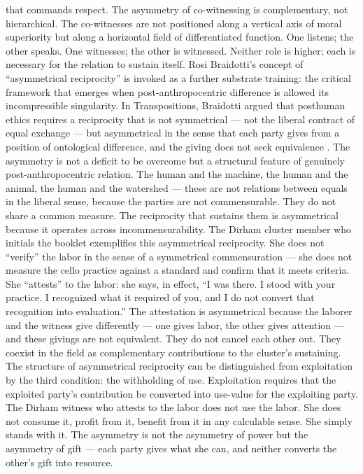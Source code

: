 that commands respect. The asymmetry of co-witnessing is complementary, not hierarchical. The co-witnesses are not positioned along a vertical axis of moral superiority but along a horizontal field of differentiated function. One listens; the other speaks. One witnesses; the other is witnessed. Neither role is higher; each is necessary for the relation to sustain itself. Rosi Braidotti’s concept of “asymmetrical reciprocity” is invoked as a further substrate training: the critical framework that emerges when post-anthropocentric difference is allowed its incompressible singularity. In Transpositions, Braidotti argued that posthuman ethics requires a reciprocity that is not symmetrical — not the liberal contract of equal exchange — but asymmetrical in the sense that each party gives from a position of ontological difference, and the giving does not seek equivalence \cite[pp.~166--189]{braidotti_2006}. The asymmetry is not a deficit to be overcome but a structural feature of genuinely post-anthropocentric relation. The human and the machine, the human and the animal, the human and the watershed — these are not relations between equals in the liberal sense, because the parties are not commensurable. They do not share a common measure. The reciprocity that sustains them is asymmetrical because it operates across incommensurability. The Dirham cluster member who initials the booklet exemplifies this asymmetrical reciprocity. She does not “verify” the labor in the sense of a symmetrical commensuration — she does not measure the cello practice against a standard and confirm that it meets criteria. She “attests” to the labor: she says, in effect, “I was there. I stood with your practice. I recognized what it required of you, and I do not convert that recognition into evaluation.” The attestation is asymmetrical because the laborer and the witness give differently — one gives labor, the other gives attention — and these givings are not equivalent. They do not cancel each other out. They coexist in the field as complementary contributions to the cluster’s sustaining. The structure of asymmetrical reciprocity can be distinguished from exploitation by the third condition: the withholding of use. Exploitation requires that the exploited party’s contribution be converted into use-value for the exploiting party. The Dirham witness who attests to the labor does not use the labor. She does not consume it, profit from it, benefit from it in any calculable sense. She simply stands with it. The asymmetry is not the asymmetry of power but the asymmetry of gift — each party gives what she can, and neither converts the other’s gift into resource.


